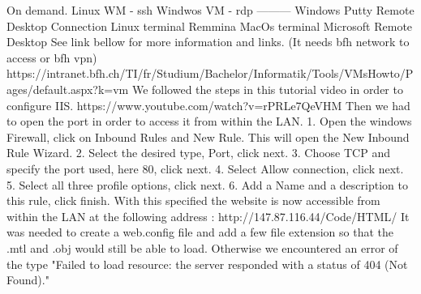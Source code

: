 \markdownRendererInterblockSeparator
{}\markdownRendererInterblockSeparator
{}\markdownRendererInterblockSeparator
{}On demand.\markdownRendererInterblockSeparator
{}\markdownRendererInterblockSeparator
{}\markdownRendererPipe{} \markdownRendererPipe{} Linux WM - ssh \markdownRendererPipe{} Windwos VM - rdp \markdownRendererPipe{} \markdownRendererPipe{}---\markdownRendererPipe{}---\markdownRendererPipe{}---\markdownRendererPipe{} \markdownRendererPipe{} Windows \markdownRendererPipe{} Putty \markdownRendererPipe{} Remote Desktop Connection \markdownRendererPipe{} \markdownRendererPipe{} Linux \markdownRendererPipe{} terminal \markdownRendererPipe{} Remmina \markdownRendererPipe{} \markdownRendererPipe{} MacOs \markdownRendererPipe{} terminal \markdownRendererPipe{} Microsoft Remote Desktop \markdownRendererPipe{}\markdownRendererInterblockSeparator
{}See link bellow for more information and links. (It needs bfh network to access or bfh vpn) https://intranet.bfh.ch/TI/fr/Studium/Bachelor/Informatik/Tools/VMsHowto/Pages/default.aspx?k=vm\markdownRendererInterblockSeparator
{}\markdownRendererInterblockSeparator
{}We followed the steps in this tutorial video in order to configure IIS. https://www.youtube.com/watch?v=rPRLe7QeVHM\markdownRendererInterblockSeparator
{}Then we had to open the port in order to access it from within the LAN. 1. Open the windows Firewall, click on Inbound Rules and New Rule. This will open the New Inbound Rule Wizard. 2. Select the desired type, Port, click next. 3. Choose TCP and specify the port used, here 80, click next. 4. Select Allow connection, click next. 5. Select all three profile options, click next. 6. Add a Name and a description to this rule, click finish.\markdownRendererInterblockSeparator
{}With this specified the website is now accessible from within the LAN at the following address : http://147.87.116.44/Code/HTML/\markdownRendererInterblockSeparator
{}\markdownRendererInterblockSeparator
{}It was needed to create a web.config file and add a few file extension so that the .mtl and .obj would still be able to load. Otherwise we encountered an error of the type "Failed to load resource: the server responded with a status of 404 (Not Found)."\relax